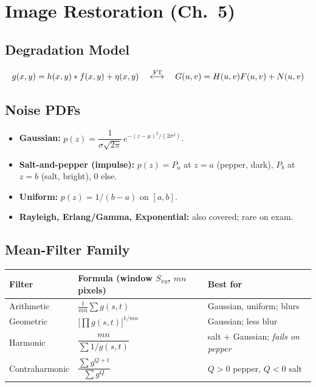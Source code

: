 \documentclass[10pt]{article}
\begin{document}
\section{Image Restoration (Ch.~5)}

\subsection{Degradation Model}
\begin{tcolorbox}[studybox]
\[
g(x,y) = h(x,y) * f(x,y) + \eta(x,y)
\quad\xleftrightarrow{\text{FT}}\quad
G(u,v) = H(u,v)F(u,v) + N(u,v)
\]
\end{tcolorbox}

\subsection{Noise PDFs}
\begin{itemize}
  \item \textbf{Gaussian:} $p(z) = \dfrac{1}{\sigma\sqrt{2\pi}}\, e^{-(z-\mu)^2/(2\sigma^2)}$.
  \item \textbf{Salt-and-pepper (impulse):} $p(z) = P_a$ at $z=a$ (pepper, dark), $P_b$ at $z=b$ (salt, bright), 0 else.
  \item \textbf{Uniform:} $p(z) = 1/(b-a)$ on $[a,b]$.
  \item \textbf{Rayleigh, Erlang/Gamma, Exponential:} also covered; rare on exam.
\end{itemize}

\subsection{Mean-Filter Family}
\begin{tcolorbox}[studybox]
\begin{tabular}{@{}lll@{}}
\toprule
\textbf{Filter} & \textbf{Formula} (window $S_{xy}$, $mn$ pixels) & \textbf{Best for} \\
\midrule
Arithmetic & $\frac{1}{mn}\sum g(s,t)$ & Gaussian, uniform; blurs \\
Geometric & $\bigl[\prod g(s,t)\bigr]^{1/mn}$ & Gaussian; less blur \\
Harmonic & $\dfrac{mn}{\sum 1/g(s,t)}$ & salt + Gaussian; \emph{fails on pepper} \\
Contraharmonic & $\dfrac{\sum g^{Q+1}}{\sum g^{Q}}$ & $Q>0$ pepper, $Q<0$ salt \\
\bottomrule
\end{tabular}
\end{tcolorbox}
\end{document}

